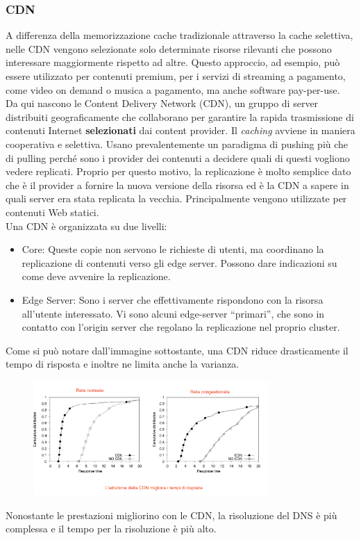 \documentclass{article}
\begin{document}
		\subsubsection{CDN}
		A differenza della memorizzazione cache tradizionale attraverso la cache selettiva, nelle CDN vengono selezionate solo determinate risorse rilevanti che possono interessare maggiormente rispetto ad altre.
		Questo approccio, ad esempio, può essere utilizzato per contenuti premium, per i servizi di streaming a pagamento, come video on demand o musica a pagamento, ma anche software pay-per-use.\\
		
		Da qui nascono le Content Delivery Network (CDN), un gruppo di server distribuiti geograficamente che collaborano per garantire la rapida trasmissione di contenuti Internet \textbf{selezionati} dai content provider.
		Il \textit{caching} avviene in maniera cooperativa e selettiva. Usano prevalentemente un paradigma di pushing più che di pulling perché sono i provider dei contenuti a decidere quali di questi vogliono vedere replicati. Proprio per questo motivo, la replicazione è molto semplice dato che è il provider a fornire la nuova versione della risorsa ed è la CDN a sapere in quali server era stata replicata la vecchia.
		Principalmente vengono utilizzate per contenuti Web statici.\\
		
		Una CDN è organizzata su due livelli:
		\begin{itemize}
			\item Core: Queste copie non servono le richieste di utenti, ma coordinano la replicazione di contenuti verso gli edge server. Possono dare indicazioni su come deve avvenire la replicazione.
			\item Edge Server: Sono i server che effettivamente rispondono con la risorsa all’utente interessato. Vi sono alcuni edge-server “primari”, che sono in contatto con l’origin server che regolano la	replicazione nel proprio cluster.
		\end{itemize}
		
		Come si può notare dall'immagine sottostante, una CDN riduce drasticamente il tempo di risposta e inoltre ne limita anche la varianza.
		\begin{figure}[ht]
		    \centering
		    \includegraphics[width=0.8\textwidth]{SAC_A4_cdn.png}
		\end{figure}
		Nonostante le prestazioni migliorino con le CDN, la risoluzione del DNS è più complessa e il tempo per la risoluzione è più alto.
		\newpage
		
\end{document}
